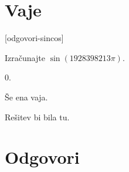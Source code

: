 \section{Vaje}
\label{sec:sin-cos-vaje}


\def\datotekaOdgovori{odgovori-sincos}

[\datotekaOdgovori]

%

\begin{vaja}
  Izračunajte $\sin(1928398213 \pi)$.

  \begin{odgovor}
    $0$.
  \end{odgovor}
\end{vaja}

\begin{vaja}
  Še ena vaja.

  \begin{odgovor}
    Rešitev bi bila tu.
  \end{odgovor}
\end{vaja}




\section{Odgovori}
\label{sec:sincos-odgovori}




